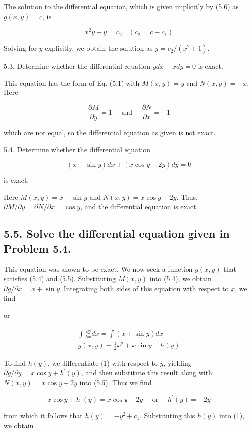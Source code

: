 \documentclass[10pt]{article}
\begin{document}
The solution to the differential equation, which is given implicitly by (5.6) as $g(x, y)=c$, is

$$
x^{2} y+y=c_{2} \quad\left(c_{2}=c-c_{1}\right)
$$

Solving for $y$ explicitly, we obtain the solution as $y=c_{2} /\left(x^{2}+1\right)$.

5.3. Determine whether the differential equation $y d x-x d y=0$ is exact.

This equation has the form of Eq. (5.1) with $M(x, y)=y$ and $N(x, y)=-x$. Here

$$
\frac{\partial M}{\partial y}=1 \quad \text { and } \quad \frac{\partial N}{\partial x}=-1
$$

which are not equal, so the differential equation as given is not exact.

5.4. Determine whether the differential equation

$$
(x+\sin y) d x+(x \cos y-2 y) d y=0
$$

is exact.

Here $M(x, y)=x+\sin y$ and $N(x, y)=x \cos y-2 y$. Thus, $\partial M / \partial y=\partial N / \partial x=\cos y$, and the differential equation is exact.

\subsection*{5.5. Solve the differential equation given in Problem 5.4.}
This equation was shown to be exact. We now seek a function $g(x, y)$ that satisfies (5.4) and (5.5). Substituting $M(x, y)$ into (5.4), we obtain $\partial g / \partial x=x+\sin y$. Integrating both sides of this equation with respect to $x$, we find

or


\begin{gather*}
\int \frac{\partial g}{\partial x} d x=\int(x+\sin y) d x \\
g(x, y)=\frac{1}{2} x^{2}+x \sin y+h(y) \tag{1}
\end{gather*}


To find $h(y)$, we differentiate (1) with respect to $y$, yielding $\partial g / \partial y=x \cos y+h^{\prime}(y)$, and then substitute this result along with $N(x, y)=x \cos y-2 y$ into (5.5). Thus we find

$$
x \cos y+h^{\prime}(y)=x \cos y-2 y \quad \text { or } \quad h^{\prime}(y)=-2 y
$$

from which it follows that $h(y)=-y^{2}+c_{1}$. Substituting this $h(y)$ into (1), we obtain
\end{document}
